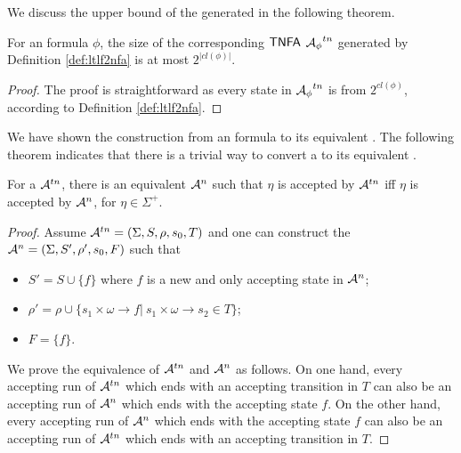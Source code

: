 We discuss the upper bound of the generated \TNFA in the following theorem.

\begin{theorem}\label{thm:tnfaBound}
For an \ltlf formula $\phi$, the size of the corresponding ${\sf TNFA}$ ${\mathcal{A}_{\phi}}^{tn}$ generated by Definition \ref{def:ltlf2nfa} is at most $2^{|cl(\phi)|}$.
\end{theorem}
\begin{proof}
	The proof is straightforward as every state in ${\mathcal{A}_{\phi}}^{tn}$ is from $2^{cl(\phi)}$, according to Definition \ref{def:ltlf2nfa}.
\end{proof}

We have shown the construction from an \ltlf formula to its equivalent \TNFA. The following theorem indicates that there is a trivial way to convert a \TNFA to its equivalent \NFA. 

\begin{theorem}\label{thm:tnfa2nfa}
For a \TNFA $\mathcal{A}^{tn}$, there is an equivalent \NFA $\mathcal{A}^n$ such that $\eta$ is accepted by $\mathcal{A}^{tn}$ iff $\eta$ is accepted by $\mathcal{A}^n$, for $\eta\in \Sigma^+$. 
\end{theorem}
\begin{proof}
Assume $\mathcal{A}^{tn}=(\Sigma, S, \rho, s_0, T)$ and one can construct the \NFA $\mathcal{A}^{n} = (\Sigma, S', \rho', s_0, F)$ such that 
\begin{itemize}
	\item $S' = S\cup \{f\}$ where $f$ is a new and only accepting state in $\mathcal{A}^n$; 
	\item $\rho'=\rho\cup\{s_1\times\omega\to f|\ s_1\times\omega\to s_2\in T\}$;
	\item $F=\{f\}$.
\end{itemize}
We prove the equivalence of $\mathcal{A}^{tn}$ and $\mathcal{A}^n$ as follows. On one hand, every accepting run of $\mathcal{A}^{tn}$ which ends with an accepting transition in $T$ can also be an accepting run of $\mathcal{A}^n$ which ends with the accepting state $f$. On the other hand, every accepting run of $\mathcal{A}^{n}$ which ends with the accepting state $f$ can also be an accepting run of $\mathcal{A}^{tn}$ which ends with an accepting transition in $T$.
\end{proof}

